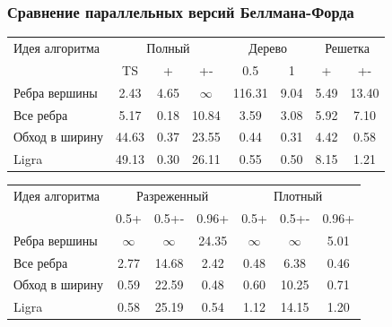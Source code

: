 \documentclass[10pt, compress]{beamer}
\begin{document}
\begin{frame}[fragile]
  \frametitle{Сравнение параллельных версий Беллмана-Форда}
\begin{table}
\centering
\begin{tabular}{l|ccc|cc|cc}  
Идея алгоритма& \multicolumn{3}{c}{Полный} & \multicolumn{2}{c}{Дерево} & \multicolumn{2}{c}{Решетка} \\
& TS & + & +- & 0.5 & 1 & + & +- \\
\hline\hline
Ребра вершины & \textcolor{cssgreen}{2.43} & 4.65 & $\infty$ & 116.31 & 9.04 & 5.49 & 13.40\\  
Все ребра & 5.17 & \textcolor{cssgreen}{0.18} & \textcolor{cssgreen}{10.84} & 3.59 & 3.08 & 5.92 & 7.10  \\
Обход в ширину & 44.63 & 0.37 & 23.55 & \textcolor{cssgreen}{0.44} & \textcolor{cssgreen}{0.31} & \textcolor{cssgreen}{4.42} & \textcolor{cssgreen}{0.58} \\
Ligra & 49.13 & 0.30 & 26.11 & 0.55 & 0.50 & 8.15 & 1.21 \\
\end{tabular}
\label{graph_description}
\end{table}


\begin{table}
\centering
\begin{tabular}{l|ccc|ccc}  
Идея алгоритма& \multicolumn{3}{c}{Разреженный} & \multicolumn{3}{c}{Плотный}\\
& 0.5+  & 0.5+- & 0.96+ & 0.5+ & 0.5+- & 0.96+\\
\hline\hline
Ребра вершины & $\infty$ & $\infty$ & 24.35 & $\infty$ & $\infty$ & 5.01 \\  
Все ребра & 2.77 & \textcolor{cssgreen}{14.68} & 2.42 & \textcolor{cssgreen}{0.48}  & \textcolor{cssgreen}{6.38}  & \textcolor{cssgreen}{0.46} \\
Обход в ширину & 0.59 & 22.59 & \textcolor{cssgreen}{0.48}  & 0.60  & 10.25 & 0.71 \\
Ligra & \textcolor{cssgreen}{0.58} & 25.19 & 0.54 & 1.12  & 14.15 & 1.20 \\
\end{tabular}
\label{graph_description}
\end{table}

\end{frame}
\end{document}
